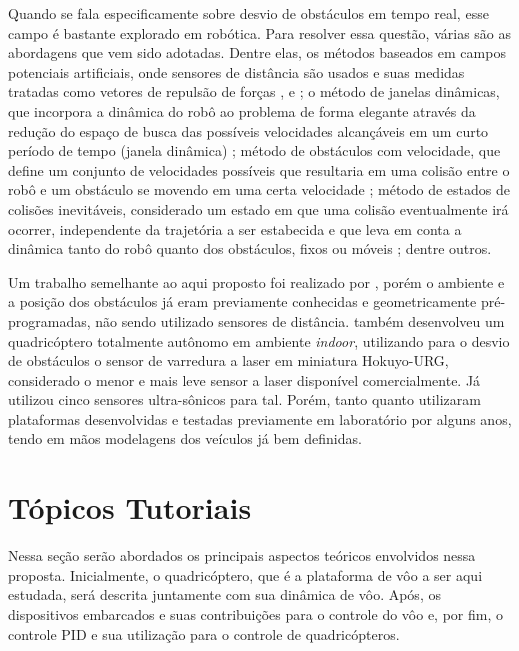 \documentclass[a4paper, 12pt]{article}
\begin{document}

Quando se fala especificamente sobre desvio de obstáculos em tempo real, esse campo é bastante explorado em robótica. Para resolver essa questão, várias são as abordagens que vem sido adotadas. Dentre elas, os métodos baseados em campos potenciais artificiais,  onde sensores de distância são usados e suas medidas tratadas como vetores de repulsão de forças \cite{Bouktir2008}, \cite{Nieuwenhuisen2013} e \cite{Borenstein1989}; o método de janelas dinâmicas, que incorpora a dinâmica do robô ao problema de forma elegante através da redução do espaço de busca das possíveis velocidades alcançáveis em um curto período de tempo (janela dinâmica) \cite{Fox1997} \cite{Saranrittichai2013}; método de obstáculos com velocidade, que define um conjunto de velocidades possíveis que resultaria em uma colisão entre o robô e um obstáculo se movendo em uma certa velocidade \cite{Fiorini1998} \cite{Claes2012} \cite{Berg2012}; método de estados de colisões inevitáveis, considerado um estado em que uma colisão eventualmente irá ocorrer, independente da trajetória a ser estabecida e que leva em conta a dinâmica tanto do robô quanto dos obstáculos, fixos ou móveis \cite{Fraichard2004}; dentre outros.   

Um trabalho semelhante ao aqui proposto foi realizado por \cite{Israelsen}, porém o ambiente e a posição dos obstáculos já eram previamente conhecidas e geometricamente pré-programadas, não sendo utilizado sensores de distância. \cite{Grzonka2012} também desenvolveu um quadricóptero totalmente autônomo em ambiente \textit{indoor}, utilizando para o desvio de obstáculos o sensor de varredura a laser em miniatura Hokuyo-URG, considerado o menor e mais leve sensor a laser disponível comercialmente. Já \cite{Becker2012} utilizou cinco sensores ultra-sônicos para tal. Porém, tanto \cite{Grzonka2012} quanto \cite{Becker2012} utilizaram plataformas desenvolvidas e testadas previamente em laboratório por alguns anos, tendo em mãos modelagens dos veículos já bem definidas.



\newpage

\section{Tópicos Tutoriais}
\label{sec:tutoriais}

Nessa seção serão abordados os principais aspectos teóricos envolvidos nessa proposta. Inicialmente, 
o quadricóptero, que é a plataforma de vôo a ser aqui estudada, será descrita juntamente com sua dinâmica de vôo. Após, os dispositivos embarcados e suas contribuições para o controle do vôo e, por fim, o controle PID e sua utilização para o controle de quadricópteros.
\end{document}
